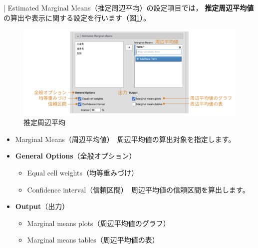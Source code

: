 \documentclass[
  12pt,
  a5jpaper,
  lualatex, ja=standard]{bxjsbook}
\providecommand{\tightlist}{%
  \setlength{\itemsep}{0pt}\setlength{\parskip}{0pt}}
\renewcommand{\emph}[1]{\textbf{\color{emph} #1}}
\newenvironment{jmvsettings}{%
	\begin{center}%
	\begin{tcolorbox}[%
		title=設定項目,
		colframe=gmoji,
		colbacktitle=gmoji,
		colback=gmoji!2!white,
		breakable,
		width=.9\textwidth,
		]\small\addtolength{\leftmargini}{-3\labelsep}%
	}%
	{\end{tcolorbox}\end{center}}
\begin{document}
\colorbox{bar}{\textcolor{gmoji2}{| Estimated Marginal Means}}（推定周辺平均）の設定項目では，\emph{推定周辺平均値}の算出や表示に関する設定を行います（図\ref{fig:regression-lr-emm}）。

\begin{figure}[!ht]

{\centering \includegraphics[width=1\linewidth]{images/regression/lr-emm} 

}

\caption{推定周辺平均}\label{fig:regression-lr-emm}
\end{figure}

\begin{jmvsettings}

\begin{itemize}
\tightlist
\item
  Marginal Means（周辺平均値）　周辺平均値の算出対象を指定します。
\item
  \textbf{General Options}（全般オプション）

  \begin{itemize}
  \tightlist
  \item
    Equal cell weights（均等重みづけ）
  \item
    Confidence interval（信頼区間）　周辺平均値の信頼区間を算出します。
  \end{itemize}
\item
  \textbf{Output}（出力）

  \begin{itemize}
  \tightlist
  \item
    Marginal means plots（周辺平均値のグラフ）
  \item
    Marginal means tables（周辺平均値の表）
  \end{itemize}
\end{itemize}

\end{jmvsettings}
\end{document}
